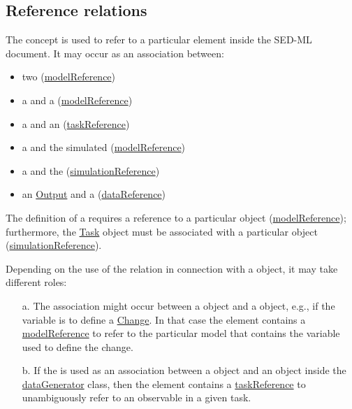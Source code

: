 \subsection{Reference relations}
\label{sec:reference}

The  concept is used to refer to a particular element inside the SED-ML document. It may occur as an association between:

\begin{itemize}
	\item{two \Models (\hyperref[sec:modelReference]{modelReference})}
	\item{a \Variable and a \Model (\hyperref[sec:modelReference]{modelReference})}
	\item{a \Variable and an \AbstractTask (\hyperref[sec:taskReference]{taskReference})}
	\item{a \Task and the simulated \Model (\hyperref[sec:modelReference]{modelReference})}
	\item{a \Task and the \Simulation (\hyperref[sec:simulationReference]{simulationReference})}
	\item{an \hyperref[class:output]{Output} and a \DataGenerator (\hyperref[sec:dataReference]{dataReference})}
\end{itemize}

The definition of a \Task requires a reference to a particular \Model object (\hyperref[sec:modelReference]{modelReference}); furthermore, the \hyperref[class:abstractTask]{Task} object must be associated with a particular \Simulation object (\hyperref[sec:simulationReference]{simulationReference}).

Depending on the use of the  relation in connection with a \Variable object, it may take different roles: 

\begin{enumerate}
\item[a.]{The  association might occur between a \Variable object and a \Model object, e.g., if the variable is to define a \hyperref[class:change]{Change}. 
In that case the  element contains a \hyperref[sec:modelReference]{modelReference} to refer to the particular model that contains the variable used to define the change.}

\item[b.]{If the  is used as an association between a \Variable object and an \AbstractTask object inside the \hyperref[class:dataGenerator]{dataGenerator} class, then the  element contains a \hyperref[sec:taskReference]{taskReference} to unambiguously refer to an observable in a given task.}
\end{enumerate}


